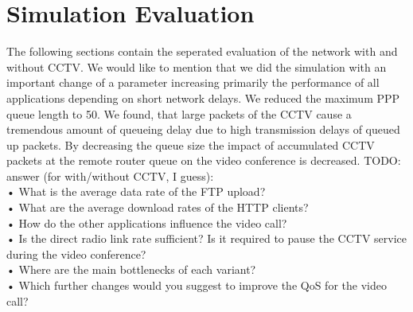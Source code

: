 \documentclass[
10pt, %
a4paper, %
oneside, %
headinclude,footinclude, %
BCOR5mm, %
]{scrartcl}
\begin{document}
\section{Simulation Evaluation}
The following sections contain the seperated evaluation of the network with and without CCTV.
We would like to mention that we did the simulation with an important change of a parameter increasing primarily the performance of all applications depending on short network delays. We reduced the maximum PPP queue length to 50. We found, that large packets of the CCTV cause a tremendous amount of queueing delay due to high transmission delays of queued up packets. By decreasing the queue size the impact of accumulated CCTV packets at the remote router queue on the video conference is decreased.
TODO: answer (for with/without CCTV, I guess):\\
• What is the average data rate of the FTP upload?\\
• What are the average download rates of the HTTP clients?\\
• How do the other applications influence the video call?\\
• Is the direct radio link rate sufficient? Is it required to pause the CCTV service during the video conference?\\
• Where are the main bottlenecks of each variant?\\
• Which further changes would you suggest to improve the QoS for the video call?\\
\end{document}

